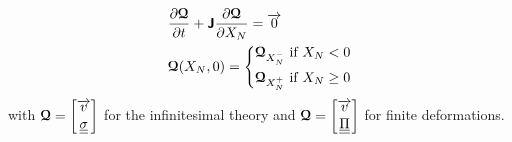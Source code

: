 \begin{equation}
  \label{eq:RP_quasilinear}
  \begin{aligned}
    &\drond{\Qcb}{t} + \Jbsf \drond{\Qcb}{X_N} = \vect{0}  \\
    & \Qcb(X_N,0)= \left\lbrace 
      \begin{aligned}
        & \Qcb_{X_N^-} \text{ if } X_N <0 \\
        & \Qcb_{X_N^{+}} \text{ if } X_N \geq 0
      \end{aligned}
        \right.
  \end{aligned}
\end{equation}
with ${\boldsymbol{\mathcal{Q}}}=\left[\begin{matrix}{\overrightarrow{v}} \\ {\underline{\underline{\sigma}}}\end{matrix}\right]$ for the infinitesimal theory and ${\boldsymbol{\mathcal{Q}}} = \left[\begin{matrix}{\overrightarrow{v}} \\ {\underline{\underline{\Pi}}}\end{matrix}\right]$ for finite deformations.


